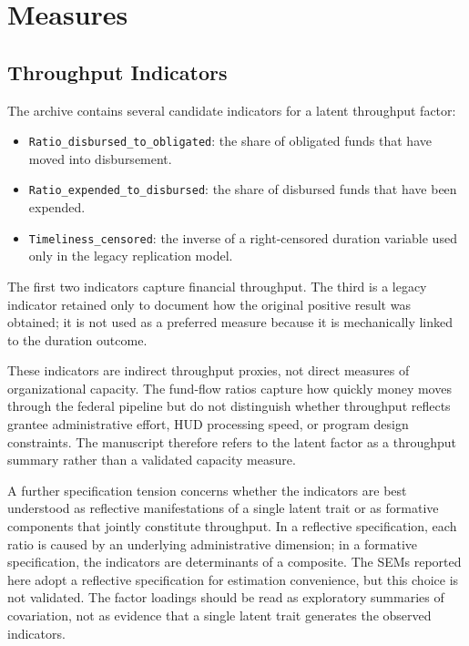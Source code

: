 \documentclass[
  letterpaper,
]{article}
\providecommand{\tightlist}{%
  \setlength{\itemsep}{0pt}\setlength{\parskip}{0pt}}
\begin{document}
\section{Measures}\label{measures}

\subsection{Throughput Indicators}\label{throughput-indicators}

The archive contains several candidate indicators for a latent
throughput factor:

\begin{itemize}
\tightlist
\item
  \texttt{Ratio\_disbursed\_to\_obligated}: the share of obligated funds
  that have moved into disbursement.
\item
  \texttt{Ratio\_expended\_to\_disbursed}: the share of disbursed funds
  that have been expended.
\item
  \texttt{Timeliness\_censored}: the inverse of a right-censored
  duration variable used only in the legacy replication model.
\end{itemize}

The first two indicators capture financial throughput. The third is a
legacy indicator retained only to document how the original positive
result was obtained; it is not used as a preferred measure because it is
mechanically linked to the duration outcome.

These indicators are indirect throughput proxies, not direct measures of
organizational capacity. The fund-flow ratios capture how quickly money
moves through the federal pipeline but do not distinguish whether
throughput reflects grantee administrative effort, HUD processing speed,
or program design constraints. The manuscript therefore refers to the
latent factor as a throughput summary rather than a validated capacity
measure.

A further specification tension concerns whether the indicators are best
understood as reflective manifestations of a single latent trait or as
formative components that jointly constitute throughput. In a reflective
specification, each ratio is caused by an underlying administrative
dimension; in a formative specification, the indicators are determinants
of a composite. The SEMs reported here adopt a reflective specification
for estimation convenience, but this choice is not validated. The factor
loadings should be read as exploratory summaries of covariation, not as
evidence that a single latent trait generates the observed indicators.
\end{document}
